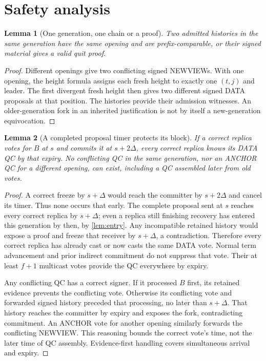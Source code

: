 \documentclass[11pt,a4paper]{article}
\newtheorem{lemma}[lemma]{Lemma}
\begin{document}
\section{Safety analysis}
\label{sec:safety}
\begin{lemma}[One generation, one chain or a proof]
\label{lem:fork}
Two admitted histories in the same generation have the same opening and
are prefix-comparable, or their signed material gives a valid quit proof.
\end{lemma}
\begin{proof}
Different openings give two conflicting signed NEWVIEWs. With one opening,
the height formula assigns each fresh height to exactly one $(t,j)$ and
leader. The first divergent fresh height then gives two different signed
DATA proposals at that position. The histories provide their admission
witnesses. An older-generation fork in an inherited justification is not
by itself a new-generation equivocation.
\end{proof}

\begin{lemma}[A completed proposal timer protects its block]
\label{lem:timer}
If a correct replica votes for $B$ at $s$ and commits it at $s+2\Delta$,
every correct replica knows its DATA QC by that expiry. No conflicting
QC in the same generation, nor an ANCHOR QC for a different opening,
can exist, including a QC assembled later from old votes.
\end{lemma}
\begin{proof}
A correct freeze by $s+\Delta$ would reach the committer by $s+2\Delta$
and cancel its timer. Thus none occurs that early. The complete proposal
sent at $s$ reaches every correct replica by $s+\Delta$; even a replica
still finishing recovery has entered this generation by then, by
\cref{lem:entry}. Any incompatible retained history would expose a proof
and freeze that receiver by $s+\Delta$, a contradiction. Therefore every
correct replica has already cast or now casts the same DATA vote. Normal
term advancement and prior indirect commitment do not suppress that vote.
Their at least $f+1$ multicast votes provide the QC everywhere by expiry.

Any conflicting QC has a correct signer. If it processed $B$ first, its
retained evidence prevents the conflicting vote. Otherwise its conflicting
vote and forwarded signed history preceded that processing, no later
than $s+\Delta$. That history reaches the committer by expiry and exposes
the fork, contradicting commitment. An ANCHOR vote for another opening
similarly forwards the conflicting NEWVIEW. This reasoning bounds the
correct vote's time, not the later time of QC assembly. Evidence-first
handling covers simultaneous arrival and expiry.
\end{proof}
\end{document}
